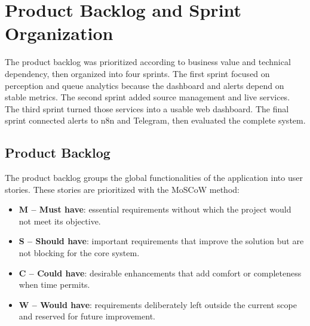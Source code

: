 \section{Product Backlog and Sprint Organization}
The product backlog was prioritized according to business value and technical dependency, then organized into four sprints. The first sprint focused on perception and queue analytics because the dashboard and alerts depend on stable metrics. The second sprint added source management and live services. The third sprint turned those services into a usable web dashboard. The final sprint connected alerts to n8n and Telegram, then evaluated the complete system.

\subsection{Product Backlog}
The product backlog groups the global functionalities of the application into user stories. These stories are prioritized with the MoSCoW method:
\begin{itemize}
    \item \textbf{M -- Must have}: essential requirements without which the project would not meet its objective.
    \item \textbf{S -- Should have}: important requirements that improve the solution but are not blocking for the core system.
    \item \textbf{C -- Could have}: desirable enhancements that add comfort or completeness when time permits.
    \item \textbf{W -- Would have}: requirements deliberately left outside the current scope and reserved for future improvement.
\end{itemize}

